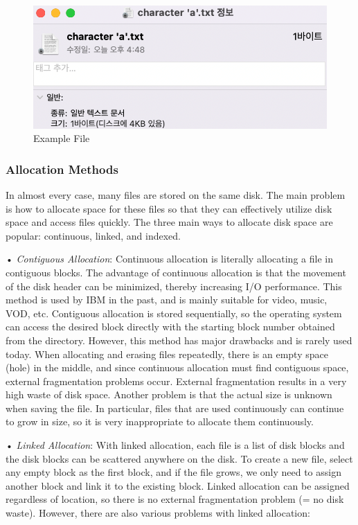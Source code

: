 \documentclass{homework}
\begin{document}
\begin{figure}[h]
\begin{center}
\includegraphics[scale=0.7]{39.png}    
\caption{Example File}
\end{center}
\end{figure}

\subsubsection{Allocation Methods}
In almost every case, many files are stored on the same disk. The main problem is how to allocate space for these files so that they can effectively utilize disk space and access files quickly. The three main ways to allocate disk space are popular: continuous, linked, and indexed.

• \textit{Contiguous Allocation}: Continuous allocation is literally allocating a file in contiguous blocks. The advantage of continuous allocation is that the movement of the disk header can be minimized, thereby increasing I/O performance. This method is used by IBM in the past, and is mainly suitable for video, music, VOD, etc.
 Contiguous allocation is stored sequentially, so the operating system can access the desired block directly with the starting block number obtained from the directory. However, this method has major drawbacks and is rarely used today. When allocating and erasing files repeatedly, there is an empty space (hole) in the middle, and since continuous allocation must find contiguous space, external fragmentation problems occur. External fragmentation results in a very high waste of disk space. Another problem is that the actual size is unknown when saving the file. In particular, files that are used continuously can continue to grow in size, so it is very inappropriate to allocate them continuously. 

• \textit{Linked Allocation}: With linked allocation, each file is a list of disk blocks and the disk blocks can be scattered anywhere on the disk. To create a new file, select any empty block as the first block, and if the file grows, we only need to assign another block and link it to the existing block. Linked allocation can be assigned regardless of location, so there is no external fragmentation problem (= no disk waste).
However, there are also various problems with linked allocation:
\end{document}

